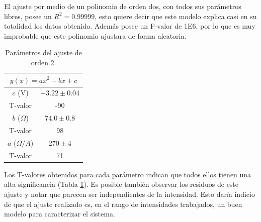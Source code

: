 \documentclass[twoside,twocolumn,a4paper]{article}
\begin{document}

El ajuste por medio de un polinomio de orden dos, con todos sus par\'ametros libres, posee un $R^2 = 0.99999$, esto quiere decir que este modelo explica casi en su totalidad los datos obtenido. Adem\'as posee un F-valor de 1E6, por lo que es muy improbable que este polinomio ajustara de forma aleatoria.\par

\begin{table}[h!]
\centering
\caption{Par\'ametros del ajuste de orden 2.}
\label{tab:o2}
\begin{tabular}{|c|c|}
\hline
\multicolumn{2}{|c|}{$y(x)=ax^2+bx+c$} \\ \hline
$c$ (V)           & $-3.22\pm0.04$        \\ \hline
T-valor        & -90                   \\ \hline
$b$ ($\Omega$)     & $74.0\pm0.8$          \\ \hline
T-valor        & 98                    \\ \hline
$a$ ($\Omega/A$)  & $270\pm4$             \\ \hline
T-valor        & 71                    \\ \hline
\end{tabular}
\end{table}


Los T-valores obtenidos para cada par\'ametro indican que todos ellos tienen una alta significancia (Tabla \ref{tab:o2}). Es posible tambi\'en observar los residuos de este ajuste y notar que parecen ser independientes de la intensidad. Esto dar\'ia indicio de que el ajuste realizado es, en el rango de intensidades trabajados, un buen modelo para caracterizar el sistema.\par
\end{document}
